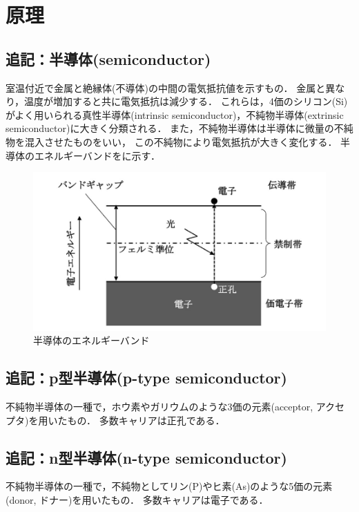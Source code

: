 \clearpage
\section{原理}
\subsection{追記：半導体(semiconductor)}
室温付近で金属と絶縁体(不導体)の中間の電気抵抗値を示すもの．
金属と異なり，温度が増加すると共に電気抵抗は減少する．
これらは，4価のシリコン(Si)がよく用いられる真性半導体(intrinsic semiconductor)，不純物半導体(extrinsic semiconductor)に大きく分類される．
また，不純物半導体は半導体に微量の不純物を混入させたものをいい，
この不純物により電気抵抗が大きく変化する．
半導体のエネルギーバンドをに示す．

\begin{figure}[h]
	\centering
	\includegraphics[scale=0.8]{./fig/semi-band.png}
	\caption{半導体のエネルギーバンド\cite{sdfnvd}}
	\label{fig:semi-band}
\end{figure}

\subsection{追記：p型半導体(p-type semiconductor)}
不純物半導体の一種で，ホウ素やガリウムのような3価の元素(acceptor, アクセプタ)を用いたもの．
多数キャリアは正孔である．

\subsection{追記：n型半導体(n-type semiconductor)}
不純物半導体の一種で，不純物としてリン(P)やヒ素(As)のような5価の元素(donor, ドナー)を用いたもの．
多数キャリアは電子である．

